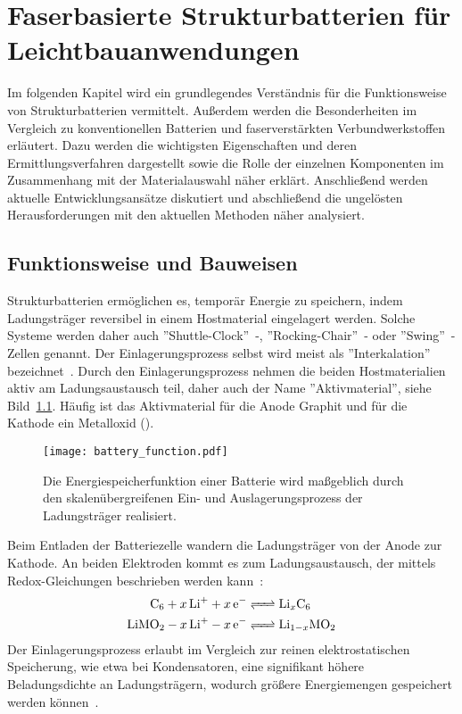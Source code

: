 \chapter{Faserbasierte Strukturbatterien für Leichtbauanwendungen}

Im folgenden Kapitel wird ein grundlegendes Verständnis für die Funktionsweise von Strukturbatterien vermittelt. Außerdem werden die Besonderheiten im Vergleich zu konventionellen Batterien und faserverstärkten Verbundwerkstoffen erläutert. Dazu werden die wichtigsten Eigenschaften und deren Ermittlungsverfahren dargestellt sowie die Rolle der einzelnen Komponenten im Zusammenhang mit der Materialauswahl näher erklärt. Anschließend werden aktuelle Entwicklungsansätze diskutiert und abschließend die ungelösten Herausforderungen mit den aktuellen Methoden näher analysiert.

\section{Funktionsweise und Bauweisen} 

Strukturbatterien ermöglichen es, temporär Energie zu speichern, indem Ladungsträger reversibel in einem Hostmaterial eingelagert werden. Solche Systeme werden daher auch ''Shuttle-Clock''~\cite{Ohzuku1993}-, ''Rocking-Chair''~\cite{Tarascon1993}- oder ''Swing''~\cite{Bittihn1993}-Zellen genannt. Der Einlagerungsprozess selbst wird meist als ''Interkalation'' bezeichnet~\cite{Eichinger1976}. Durch den Einlagerungsprozess nehmen die beiden Hostmaterialien aktiv am Ladungsaustausch teil, daher auch der Name ''Aktivmaterial'', siehe Bild~\ref{fig:battery_function}. Häufig ist das Aktivmaterial für die Anode Graphit und für die Kathode ein Metalloxid ().
\begin{figure}[ht]
        \center
	\texttt{[image: battery\_function.pdf]}
		\caption{\label{fig:battery_function}Die Energiespeicherfunktion einer Batterie wird maßgeblich durch den skalenübergreifenen Ein- und Auslagerungsprozess der Ladungsträger realisiert.}
\end{figure}
Beim Entladen der Batteriezelle wandern die Ladungsträger von der Anode zur Kathode. An beiden Elektroden kommt es zum Ladungsaustausch, der mittels Redox-Gleichungen beschrieben werden kann~\cite{Goodenough2013}: 
\begin{align}
	\ce{C_6 + x Li^+ + x e^- &<=> Li_xC_6}\\ 
	\ce{LiMO_2 - x Li^+ - x e^- &<=> Li_{1-x}MO_2} 
\end{align} 
Der Einlagerungsprozess erlaubt im Vergleich zur reinen elektrostatischen Speicherung, wie etwa bei Kondensatoren, eine signifikant höhere Beladungsdichte an Ladungsträgern, wodurch größere Energiemengen gespeichert werden können~\cite{Newman2021}.

